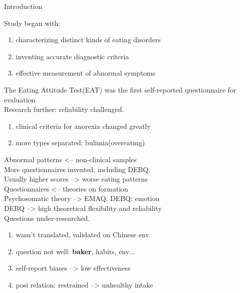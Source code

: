 \documentclass[final]{beamer}
\newlength{\sepwid}
\newlength{\onecolwid}
\begin{document}
\begin{frame}[t]
\begin{columns}[t]
\begin{column}{\onecolwid}
\begin{block}{Introduction}

Study began with: 
\begin{enumerate}
	\item characterizing distinct kinds of eating disorders
	\item inventing accurate diagnostic criteria
	\item effective measurement of abnormal symptoms
\end{enumerate}
The Eating Attitude Test(EAT) was the first self-reported questionnaire for evaluation \\
\indent Research further: reliability challenged. 
\begin{enumerate}
	\item clinical criteria for anorexia changed greatly
	\item more types separated: bulimia(overeating)
\end{enumerate}
Abnormal patterns <-- non-clinical samples \\
More questionnaires invented, including DEBQ. \\
Usually higher scores --> worse eating patterns \\
\bigskip
Questionnaires <-- theories on formation \\
Psychosomatic theory --> EMAQ, DEBQ: emotion \\
DEBQ --> high theoretical flexibility and reliability \\
\bigskip
Questions under-researched.
\begin{enumerate}
	\item wasn't translated, validated on Chinese env
	\item question not well: \textbf{baker}, habits, env...
	\item self-report biases --> low effectiveness
	\item posi relation: restrained --> unhealthy intake
\end{enumerate} 

\end{block}



\end{column} %

\begin{column}{\sepwid}\end{column} %


\end{columns}
\end{frame}
\end{document}
